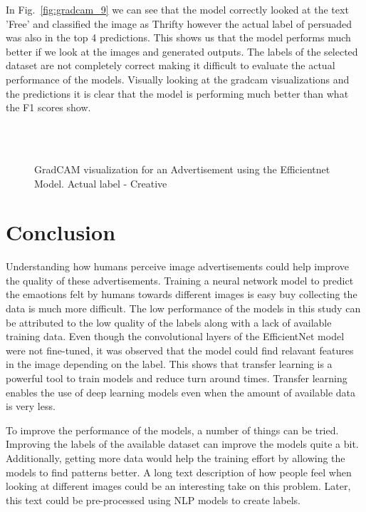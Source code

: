 \documentclass[conference]{IEEEtran}
\begin{document}
In Fig.~\ref{fig:gradcam_9} we can 
see that the model correctly looked at the text 'Free' and classified the image as Thrifty 
however the actual label of persuaded was also in the top 4 predictions. This shows us that 
the model performs much better if we look at the images and generated outputs. The labels 
of the selected dataset are not completely correct making it difficult to evaluate the 
actual performance of the models. Visually looking at the gradcam visualizations and the 
predictions it is clear that the model is performing much better than what the F1 scores show.

\begin{figure}
    
    \\
    \\
    \caption{GradCAM visualization for an Advertisement using the Efficientnet Model. Actual label - Creative}
    \label{fig:gradcam_7}
  \end{figure}


\section{Conclusion}

Understanding how humans perceive image advertisements could help improve 
the quality of these advertisements. Training a neural network model 
to predict the emaotions felt by humans towards different images is easy 
buy collecting the data is much more difficult. The low performance of 
the models in this study can be attributed to the low quality of the labels 
along with a lack of available training data. Even though the convolutional 
 layers of the EfficientNet model were not fine-tuned, it was observed that 
 the model could find relavant features in the image depending on the label. 
 This shows that transfer learning is a powerful tool to train models and 
 reduce turn around times. Transfer learning enables the use of deep learning models 
 even when the amount of available data is very less. 
 
 To improve the performance of the models, a number of things can be tried. 
 Improving the labels of the available dataset can improve the models 
 quite a bit. Additionally, getting more data would help the training effort 
 by allowing the models to find patterns better. A long text description 
 of how people feel when looking at different images could be an interesting 
 take on this problem. Later, this text could be pre-processed using NLP 
 models to create labels.
\end{document}
